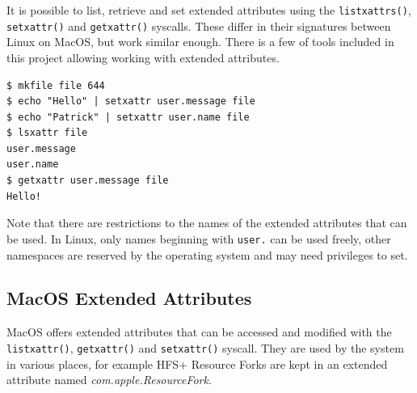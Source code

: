 \documentclass[a4paper]{article}
\begin{document}


It is possible to list, retrieve and set extended attributes using the \verb|listxattrs()|, \verb|setxattr()| and \verb|getxattr()| syscalls. These differ in their signatures between Linux on MacOS, but work similar enough. There is a few of tools included in this project allowing working with extended attributes.

\begin{verbatim}
$ mkfile file 644
$ echo "Hello" | setxattr user.message file
$ echo "Patrick" | setxattr user.name file
$ lsxattr file
user.message
user.name
$ getxattr user.message file
Hello!
\end{verbatim}

Note that there are restrictions to the names of the extended attributes that can be used. In Linux, only names beginning with \verb|user.| can be used freely, other namespaces are reserved by the operating system and may need privileges to set.

\subsection{MacOS Extended Attributes}


MacOS offers extended attributes that can be accessed and modified with the \verb|listxattr()|, \verb|getxattr()| and \verb|setxattr()| syscall. They are used by the system in various places, for example HFS+ Resource Forks are kept in an extended attribute named \emph{com.apple.ResourceFork}.
\end{document}
